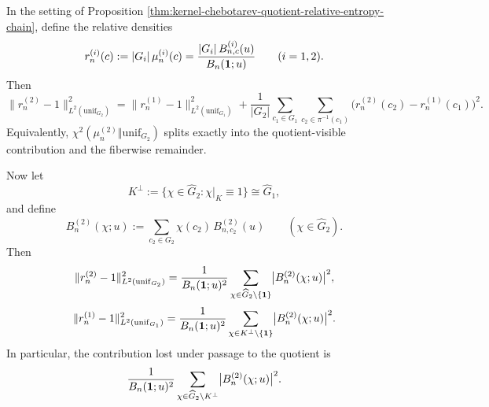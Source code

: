 \begin{proposition}\label{thm:kernel-chebotarev-visible-hidden-character-energy}
In the setting of Proposition \ref{thm:kernel-chebotarev-quotient-relative-entropy-chain}, define the relative densities
\[
r_n^{(i)}(c):=|G_i|\,\mu_n^{(i)}(c)
=
\frac{|G_i|\,B^{(i)}_{n,c}(u)}{B_n(\mathbf{1};u)}
\qquad(i=1,2).
\]
Then
\[
\|r_n^{(2)}-1\|_{L^2(\mathrm{unif}_{G_2})}^2
=
\|r_n^{(1)}-1\|_{L^2(\mathrm{unif}_{G_1})}^2
+
\frac{1}{|G_2|}\sum_{c_1\in G_1}\sum_{c_2\in\pi^{-1}(c_1)}
\bigl(r_n^{(2)}(c_2)-r_n^{(1)}(c_1)\bigr)^2.
\]
Equivalently, \(\chi^2(\mu_n^{(2)}\Vert\mathrm{unif}_{G_2})\) splits exactly into the quotient-visible contribution and the fiberwise remainder.

Now let
\[
K^\perp:=\{\chi\in\widehat G_2:\chi|_K\equiv 1\}\cong\widehat G_1,
\]
and define
\[
B_n^{(2)}(\chi;u):=\sum_{c_2\in G_2}\chi(c_2)\,B^{(2)}_{n,c_2}(u)
\qquad(\chi\in\widehat G_2).
\]
Then
\[
\|r_n^{(2)}-1\|_{L^2(\mathrm{unif}_{G_2})}^2
=
\frac{1}{B_n(\mathbf{1};u)^2}
\sum_{\chi\in\widehat G_2\setminus\{\mathbf{1}\}}
\bigl|B_n^{(2)}(\chi;u)\bigr|^2,
\]
\[
\|r_n^{(1)}-1\|_{L^2(\mathrm{unif}_{G_1})}^2
=
\frac{1}{B_n(\mathbf{1};u)^2}
\sum_{\chi\in K^\perp\setminus\{\mathbf{1}\}}
\bigl|B_n^{(2)}(\chi;u)\bigr|^2.
\]
In particular, the contribution lost under passage to the quotient is
\[
\frac{1}{B_n(\mathbf{1};u)^2}
\sum_{\chi\in\widehat G_2\setminus K^\perp}
\bigl|B_n^{(2)}(\chi;u)\bigr|^2.
\]
\end{proposition}

